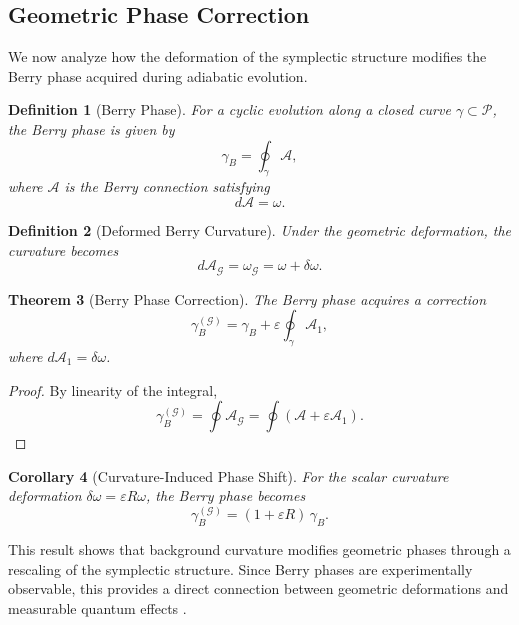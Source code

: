 \documentclass[11pt, a4paper]{article}
\newtheorem{theorem}{Theorem}[section]
\newtheorem{definition}[theorem]{Definition}
\newtheorem{corollary}[theorem]{Corollary}
\begin{document}
\subsection{Geometric Phase Correction}

We now analyze how the deformation of the symplectic structure modifies
the Berry phase acquired during adiabatic evolution.

\begin{definition}[Berry Phase]
For a cyclic evolution along a closed curve $\gamma \subset \mathcal{P}$,
the Berry phase is given by
\[
\gamma_B = \oint_{\gamma} \mathcal{A},
\]
where $\mathcal{A}$ is the Berry connection satisfying
\[
d\mathcal{A} = \omega.
\]
\end{definition}

\begin{definition}[Deformed Berry Curvature]
Under the geometric deformation, the curvature becomes
\[
d\mathcal{A}_{\mathcal{G}} = \omega_{\mathcal{G}}
= \omega + \delta\omega.
\]
\end{definition}

\begin{theorem}[Berry Phase Correction]
The Berry phase acquires a correction
\[
\gamma_B^{(\mathcal{G})}
= \gamma_B + \varepsilon \oint_{\gamma} \mathcal{A}_1,
\]
where $d\mathcal{A}_1 = \delta\omega$.
\end{theorem}

\begin{proof}
By linearity of the integral,
\[
\gamma_B^{(\mathcal{G})}
= \oint \mathcal{A}_{\mathcal{G}}
= \oint (\mathcal{A} + \varepsilon \mathcal{A}_1).
\]
\end{proof}

\begin{corollary}[Curvature-Induced Phase Shift]
For the scalar curvature deformation $\delta\omega = \varepsilon R \omega$,
the Berry phase becomes
\[
\gamma_B^{(\mathcal{G})} = (1+\varepsilon R)\,\gamma_B.
\]
\end{corollary}


This result shows that background curvature modifies geometric phases
through a rescaling of the symplectic structure. Since Berry phases are
experimentally observable, this provides a direct connection between
geometric deformations and measurable quantum effects
\cite{berry1984,simon1983}.
\end{document}
